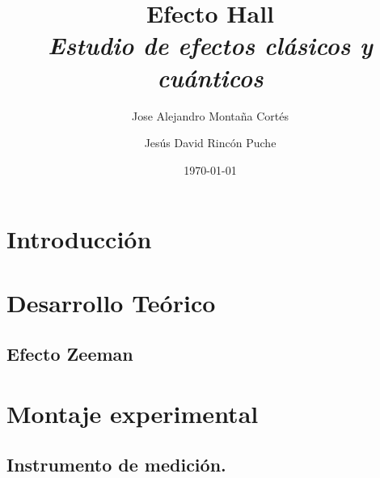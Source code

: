 \documentclass[%
 reprint,
 amsmath,amssymb,
 aps,
]{revtex4-1}
\newcommand{\subtitle}[1]{%
\posttitle{%
    \par\end{center}
\begin{center}\large#1\end{center}
\vskip0.5em}%
}
\begin{document}

\title{Efecto Hall\\ \textit{Estudio de efectos clásicos y cuánticos } }%


\author{Jose Alejandro Montaña Cortés}
\author{Jesús David Rincón Puche}%
%


\date{\today}%

\begin{abstract}


\end{abstract}
\maketitle

\section{Introducción}

 
 
 \section{Desarrollo Teórico}
 
 \subsection{Efecto Zeeman}
 

\section{Montaje experimental}
\subsection{Instrumento de medición.}


\end{document}
